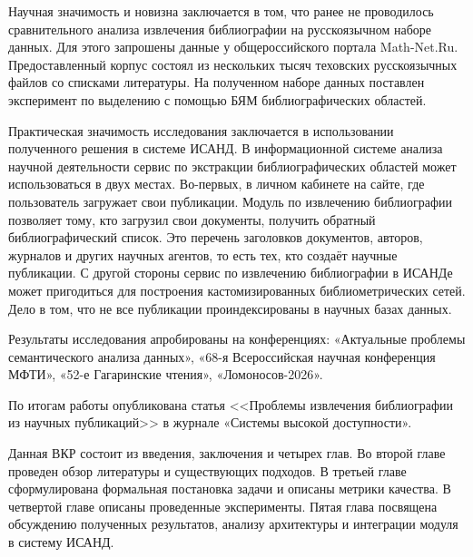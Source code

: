 Научная значимость и новизна заключается в том, что ранее не проводилось сравнительного анализа извлечения библиографии на русскоязычном наборе данных. Для этого запрошены данные у общероссийского портала Math-Net.Ru. Предоставленный корпус состоял из нескольких тысяч теховских русскоязычных файлов со списками литературы. На полученном наборе данных поставлен эксперимент по выделению с помощью БЯМ библиографических областей.

Практическая значимость исследования заключается в использовании полученного решения в системе ИСАНД. В информационной системе анализа научной деятельности сервис по экстракции библиографических областей может использоваться в двух местах. Во-первых, в личном кабинете на сайте, где пользователь загружает свои публикации. Модуль по извлечению библиографии позволяет тому, кто загрузил свои документы, получить обратный библиографический список. Это перечень заголовков документов, авторов, журналов и других научных агентов, то есть тех, кто создаёт научные публикации. С другой стороны сервис по извлечению библиографии в ИСАНДе может пригодиться для построения кастомизированных библиометрических сетей. Дело в том, что не все публикации проиндексированы в научных базах данных.

Результаты исследования апробированы на конференциях: «Актуальные проблемы семантического анализа данных», «68-я Всероссийская научная конференция МФТИ», «52-е Гагаринские чтения», «Ломоносов-2026».

По итогам работы опубликована статья <<Проблемы извлечения библиографии из научных публикаций>> в журнале «Системы высокой доступности»\cite{system_higher}.

Данная ВКР состоит из введения, заключения и четырех глав. Во второй главе проведен обзор литературы и существующих подходов. В третьей главе сформулирована формальная постановка задачи и описаны метрики качества. В четвертой главе описаны проведенные эксперименты. Пятая глава посвящена обсуждению полученных результатов, анализу архитектуры и интеграции модуля в систему ИСАНД.
